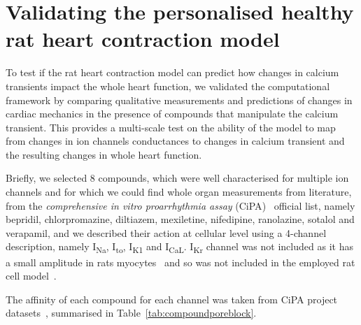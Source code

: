 %
%
%
\section{Validating the personalised healthy rat heart contraction model}\label{sec:ch6validatingthepersonalisedhealthyratheartcontractionmodel}
To test if the rat heart contraction model can predict how changes in calcium transients impact the whole heart function, we validated the computational framework by comparing qualitative measurements and predictions of changes in cardiac mechanics in the presence of compounds that manipulate the calcium transient. This provides a multi-scale test on the ability of the model to map from changes in ion channels conductances to changes in calcium transient and the resulting changes in whole heart function.

\vspace{0.2cm}
Briefly, we selected $8$ compounds, which were well characterised for multiple ion channels and for which we could find whole organ measurements from literature, from the \textit{comprehensive in vitro proarrhythmia assay} (\acs{CiPA})~\cite{Park:2019} official list, namely bepridil, chlorpromazine, diltiazem, mexiletine, nifedipine, ranolazine, sotalol and verapamil, and we described their action at cellular level using a 4-channel description, namely I\textsubscript{Na}, I\textsubscript{to}, I\textsubscript{K1} and I\textsubscript{CaL}. I\textsubscript{Kr} channel was not included as it has a small amplitude in rats myocytes~\cite{Wymore:1997} and so was not included in the employed rat cell model~\cite{Gattoni:2017}.

\vspace{0.2cm}
The affinity of each compound for each channel was taken from CiPA project datasets~\cite{Li:2018, Li:2019}, summarised in Table~\ref{tab:compoundporeblock}.

